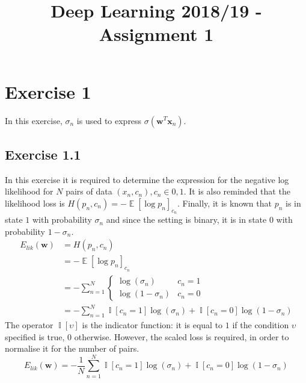 \documentclass[fleqn]{report}
\title{Deep Learning 2018/19 - Assignment 1}
\renewcommand{\vec}[1]{\mathbf{#1}}
\DeclareMathOperator{\E}{\mathbb{E}}
\DeclareMathOperator{\I}{\mathbb{I}}
\begin{document}
\section*{Exercise 1}
In this exercise, $\sigma_n$ is used to express $\sigma \left( \vec{w}^T \vec{x}_n \right )$.

\subsection*{Exercise 1.1}
In this exercise it is required to determine the expression for the negative log likelihood for $N$ pairs of data $(x_n, c_n), c_n \in {0, 1}$. It is also reminded that the likelihood loss is $H(p_n, c_n) = - \E[\log p_n]_{c_n}$. Finally, it is known that $p_n$ is in state $1$ with probability $\sigma_n$ and since the setting is binary, it is in state $0$ with probability $1 - \sigma_n$.
\begin{equation}
    \begin{split}
        E_{lik}(\vec{w}) & = H(p_n, c_n) \\
        & = - \E[\log p_n]_{c_n} \\
        & = - \sum_{n=1}^N
        \begin{cases}
            \log \left( \sigma_n \right) & c_n = 1 \\
            \log \left(1 - \sigma_n \right) & c_n = 0
        \end{cases}
        \\ & = - \sum_{n=1}^N \I[c_n = 1] \log (\sigma_n) + \I[c_n = 0] \log (1 - \sigma_n)
    \end{split}
\end{equation}
The operator $\I[\upsilon]$ is the indicator function: it is equal to $1$ if the condition $\upsilon$ specified is true, $0$ otherwise. However, the scaled loss is required, in order to normalise it for the number of pairs.
\begin{equation}
    E_{lik}(\vec{w}) = - \frac{1}{N} \sum_{n=1}^N \I[c_n = 1] \log (\sigma_n) + \I[c_n = 0] \log (1 - \sigma_n)
\end{equation}
\end{document}

